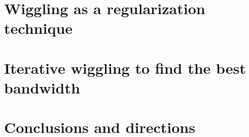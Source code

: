 \documentclass[12pt]{amsart}
\begin{document}
\section{Wiggling as a regularization technique}

\section{Iterative wiggling to find the best bandwidth}

\section{Conclusions and directions}
\end{document}
